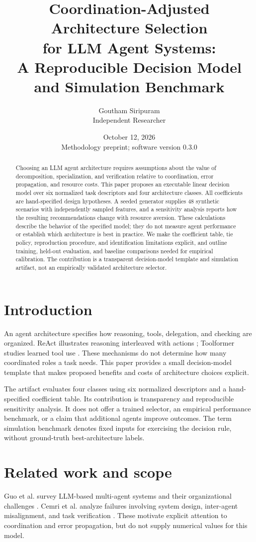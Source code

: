 \documentclass[11pt]{article}
\title{Coordination-Adjusted Architecture Selection\\for LLM Agent Systems:\\A Reproducible Decision Model and Simulation Benchmark}
\author{Goutham Siripuram\\Independent Researcher}
\date{October 12, 2026\\\small Methodology preprint; software version 0.3.0}
\begin{document}
\maketitle
\begin{abstract}
Choosing an LLM agent architecture requires assumptions about the value of decomposition, specialization, and verification relative to coordination, error propagation, and resource costs. This paper proposes an executable linear decision model over six normalized task descriptors and four architecture classes. All coefficients are hand-specified design hypotheses. A seeded generator supplies 48 synthetic scenarios with independently sampled features, and a sensitivity analysis reports how the resulting recommendations change with resource aversion. These calculations describe the behavior of the specified model; they do not measure agent performance or establish which architecture is best in practice. We make the coefficient table, tie policy, reproduction procedure, and identification limitations explicit, and outline training, held-out evaluation, and baseline comparisons needed for empirical calibration. The contribution is a transparent decision-model template and simulation artifact, not an empirically validated architecture selector.
\end{abstract}

\section{Introduction}
An agent architecture specifies how reasoning, tools, delegation, and checking are organized. ReAct illustrates reasoning interleaved with actions \cite{yao2023react}; Toolformer studies learned tool use \cite{schick2023toolformer}. These mechanisms do not determine how many coordinated roles a task needs. This paper provides a small decision-model template that makes proposed benefits and costs of architecture choices explicit.

The artifact evaluates four classes using six normalized descriptors and a hand-specified coefficient table. Its contribution is transparency and reproducible sensitivity analysis. It does not offer a trained selector, an empirical performance benchmark, or a claim that additional agents improve outcomes. The term simulation benchmark denotes fixed inputs for exercising the decision rule, without ground-truth best-architecture labels.

\section{Related work and scope}
Guo et al. survey LLM-based multi-agent systems and their organizational challenges \cite{guo2024multiagent}. Cemri et al. analyze failures involving system design, inter-agent misalignment, and task verification \cite{cemri2025failures}. These motivate explicit attention to coordination and error propagation, but do not supply numerical values for this model.
\end{document}
